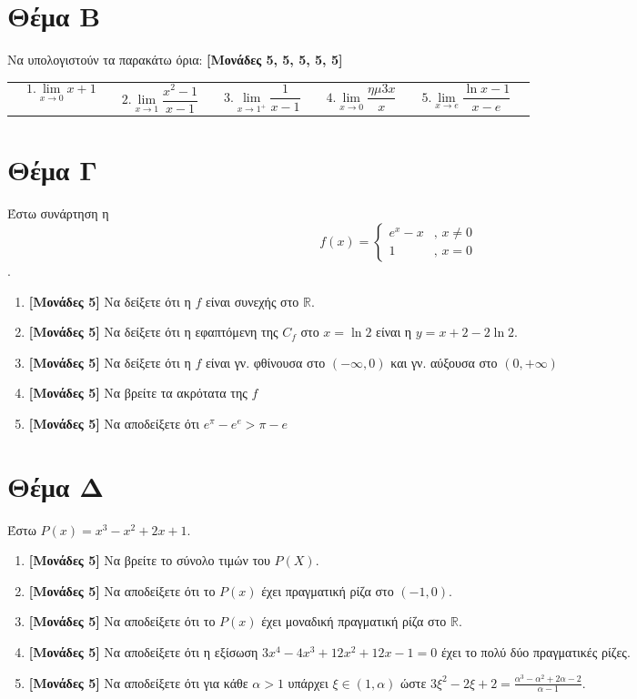 \documentclass[12pt]{article}
\begin{document}
\section*{Θέμα Β}
  \noindent

Να υπολογιστούν τα παρακάτω όρια: \textbf{[Μονάδες 5, 5, 5, 5, 5]}
  \begin{table}[ht]
    \begin{tabularx}{\textwidth}{ X p{6em} X p{6em} X p{6em} X p{6em} X p{6em} X }
      & $$1. \lim_{x \to 0} x+1 $$ & & $$2. \lim_{x \to 1} \frac{x^2-1}{x-1} $$ & & $$3. \lim_{x \to 1^{+}} \frac{1}{x-1} $$ & & $$4. \lim_{x \to 0} \frac{ημ3x}{x} $$ & & $$5. \lim_{x \to e} \frac{\ln x-1}{x-e} $$ &
    \end{tabularx}
  \end{table}

\section*{Θέμα Γ}
  \noindent

  Έστω συνάρτηση η $$f(x)=\begin{cases} e^x-x & \text{, } x \ne 0 \\ 1 & \text{, } x = 0  \end{cases}$$.
  \begin{enumerate}
    \item \textbf{[Μονάδες 5]}  Να δείξετε ότι η $f$ είναι συνεχής στο $\mathbb{R}$.
    \item \textbf{[Μονάδες 5]}  Να δείξετε ότι η εφαπτόμενη της $C_f$ στο $x=\ln2$ είναι η $y=x+2-2\ln2$.
    \item \textbf{[Μονάδες 5]}  Να δείξετε ότι η $f$ είναι γν. φθίνουσα στο $\left(-\infty,0\right)$ και γν. αύξουσα στο $\left(0,+\infty\right)$
    \item \textbf{[Μονάδες 5]}  Να βρείτε τα ακρότατα της $f$
    \item \textbf{[Μονάδες 5]}  Να αποδείξετε ότι $e^{\pi}-e^e > \pi-e$
  \end{enumerate}

\section*{Θέμα Δ}
  \noindent

  Έστω $P(x)=x^3-x^2+2x+1$.

  \begin{enumerate}
    \item \textbf{[Μονάδες 5]}  Να βρείτε το σύνολο τιμών του $P(X)$.
    \item \textbf{[Μονάδες 5]}  Να αποδείξετε ότι το $P(x)$ έχει πραγματική ρίζα στο $(-1,0)$.
    \item \textbf{[Μονάδες 5]}  Να αποδείξετε ότι το $P(x)$ έχει μοναδική πραγματική ρίζα στο $\mathbb{R}$.
    \item \textbf{[Μονάδες 5]}  Να αποδείξετε ότι η εξίσωση $3x^4-4x^3+12x^2+12x-1=0$ έχει το πολύ δύο πραγματικές ρίζες.
    \item \textbf{[Μονάδες 5]}  Να αποδείξετε ότι για κάθε $α>1$ υπάρχει $ξ\in (1,α)$ ώστε $3ξ^2-2ξ+2=\frac{α^3-α^2+2α-2}{α-1}$.
  \end{enumerate}
\end{document}

